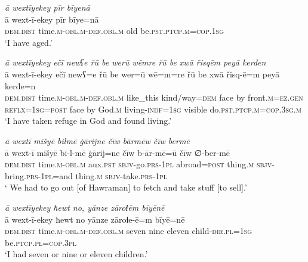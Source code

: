 \ea \label{ŽM.10}
\textit{ā wextīyekey pīr bīyenā} \\ 
\gll ā wext-ī-ekey pīr bīye=nā \\ 
 \textsc{dem.dist} time\textsc{.m}\textsc{-obl}\textsc{.m}\textsc{-def}\textsc{.obl}\textsc{.m} old be\textsc{.pst}\textsc{.ptcp}\textsc{.m}\textsc{=cop}\textsc{.\textsc{1sg}} \\ 
\glt `I have aged.'
\z 
 
\ea \label{ŽM.15}
\textit{ā wextīyekey ečī newʕe řū be werū wēmre řū be xwā řisqēm peyā kerđen} \\ 
\gll ā wext-ī-ekey ečī newʕ=e řū be wer=ū wē=m=re řū be xwā řisq-ē=m peyā kerđe=n \\ 
 \textsc{dem.dist} time\textsc{.m}\textsc{-obl}\textsc{.m}\textsc{-def}\textsc{.obl}\textsc{.m} like\_this kind/way\textsc{=dem} face by front\textsc{.m}\textsc{=ez.gen} \textsc{reflx}\textsc{=\textsc{1sg}}\textsc{=\textsc{post}} face by God\textsc{.m} living\textsc{-indf}\textsc{=\textsc{1sg}} visible do\textsc{.pst}\textsc{.ptcp}\textsc{.m}\textsc{=cop}\textsc{.3sg}\textsc{.m} \\ 
\glt `I have taken refuge in God and found living.'
\z 
 
\ea \label{ŽM.22}
\textit{ā wextī mišyē bilmē ġārijne čīw bārmēw čīw bermē} \\ 
\gll ā wext-ī mišyē bi-l-mē ġārij=ne čīw b-ār-mē=ū čīw ∅-ber-mē \\ 
 \textsc{dem.dist} time\textsc{.m}\textsc{-obl}\textsc{.m} aux\textsc{.pst} \textsc{sbjv-}go\textsc{.prs}\textsc{-\textsc{1pl}} abroad\textsc{=\textsc{post}} thing\textsc{.m} \textsc{sbjv-}bring\textsc{.prs}\textsc{-\textsc{1pl}}=and thing\textsc{.m} \textsc{sbjv-}take\textsc{.prs}\textsc{-\textsc{1pl}} \\ 
\glt ` We had to go out [of Hawraman] to fetch and take stuff [to sell].'
\z 
 
\ea \label{ŽM.26}
\textit{ā wextīyekey ħewt no, yānze zāroɫēm bīyēnē} \\ 
\gll ā wext-ī-ekey ħewt no yānze zāroɫe-ē=m bīyē=nē \\ 
 \textsc{dem.dist} time\textsc{.m}\textsc{-obl}\textsc{.m}\textsc{-def}\textsc{.obl}\textsc{.m} seven nine eleven child\textsc{-dir}\textsc{.pl}\textsc{=\textsc{1sg}} be\textsc{.ptcp}\textsc{.pl}\textsc{=cop}\textsc{.3pl} \\ 
\glt `I had seven or nine or eleven children.'
\z 
 
